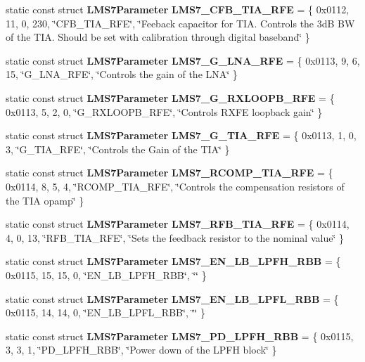 \begin{DoxyCompactItemize}
\item 
static const struct {\bf L\+M\+S7\+Parameter} {\bf L\+M\+S7\+\_\+\+C\+F\+B\+\_\+\+T\+I\+A\+\_\+\+R\+FE} = \{ 0x0112, 11, 0, 230, \char`\"{}\+C\+F\+B\+\_\+\+T\+I\+A\+\_\+\+R\+F\+E\char`\"{}, \char`\"{}\+Feeback capacitor for T\+I\+A. Controls the 3d\+B B\+W of the T\+I\+A. Should be set with calibration through digital baseband\char`\"{} \}
\item 
static const struct {\bf L\+M\+S7\+Parameter} {\bf L\+M\+S7\+\_\+\+G\+\_\+\+L\+N\+A\+\_\+\+R\+FE} = \{ 0x0113, 9, 6, 15, \char`\"{}\+G\+\_\+\+L\+N\+A\+\_\+\+R\+F\+E\char`\"{}, \char`\"{}\+Controls the gain of the L\+N\+A\char`\"{} \}
\item 
static const struct {\bf L\+M\+S7\+Parameter} {\bf L\+M\+S7\+\_\+\+G\+\_\+\+R\+X\+L\+O\+O\+P\+B\+\_\+\+R\+FE} = \{ 0x0113, 5, 2, 0, \char`\"{}\+G\+\_\+\+R\+X\+L\+O\+O\+P\+B\+\_\+\+R\+F\+E\char`\"{}, \char`\"{}\+Controls R\+X\+F\+E loopback gain\char`\"{} \}
\item 
static const struct {\bf L\+M\+S7\+Parameter} {\bf L\+M\+S7\+\_\+\+G\+\_\+\+T\+I\+A\+\_\+\+R\+FE} = \{ 0x0113, 1, 0, 3, \char`\"{}\+G\+\_\+\+T\+I\+A\+\_\+\+R\+F\+E\char`\"{}, \char`\"{}\+Controls the Gain of the T\+I\+A\char`\"{} \}
\item 
static const struct {\bf L\+M\+S7\+Parameter} {\bf L\+M\+S7\+\_\+\+R\+C\+O\+M\+P\+\_\+\+T\+I\+A\+\_\+\+R\+FE} = \{ 0x0114, 8, 5, 4, \char`\"{}\+R\+C\+O\+M\+P\+\_\+\+T\+I\+A\+\_\+\+R\+F\+E\char`\"{}, \char`\"{}\+Controls the compensation resistors of the T\+I\+A opamp\char`\"{} \}
\item 
static const struct {\bf L\+M\+S7\+Parameter} {\bf L\+M\+S7\+\_\+\+R\+F\+B\+\_\+\+T\+I\+A\+\_\+\+R\+FE} = \{ 0x0114, 4, 0, 13, \char`\"{}\+R\+F\+B\+\_\+\+T\+I\+A\+\_\+\+R\+F\+E\char`\"{}, \char`\"{}\+Sets the feedback resistor to the nominal value\char`\"{} \}
\item 
static const struct {\bf L\+M\+S7\+Parameter} {\bf L\+M\+S7\+\_\+\+E\+N\+\_\+\+L\+B\+\_\+\+L\+P\+F\+H\+\_\+\+R\+BB} = \{ 0x0115, 15, 15, 0, \char`\"{}\+E\+N\+\_\+\+L\+B\+\_\+\+L\+P\+F\+H\+\_\+\+R\+B\+B\char`\"{}, \char`\"{}\char`\"{} \}
\item 
static const struct {\bf L\+M\+S7\+Parameter} {\bf L\+M\+S7\+\_\+\+E\+N\+\_\+\+L\+B\+\_\+\+L\+P\+F\+L\+\_\+\+R\+BB} = \{ 0x0115, 14, 14, 0, \char`\"{}\+E\+N\+\_\+\+L\+B\+\_\+\+L\+P\+F\+L\+\_\+\+R\+B\+B\char`\"{}, \char`\"{}\char`\"{} \}
\item 
static const struct {\bf L\+M\+S7\+Parameter} {\bf L\+M\+S7\+\_\+\+P\+D\+\_\+\+L\+P\+F\+H\+\_\+\+R\+BB} = \{ 0x0115, 3, 3, 1, \char`\"{}\+P\+D\+\_\+\+L\+P\+F\+H\+\_\+\+R\+B\+B\char`\"{}, \char`\"{}\+Power down of the L\+P\+F\+H block\char`\"{} \}

\end{DoxyCompactItemize}

